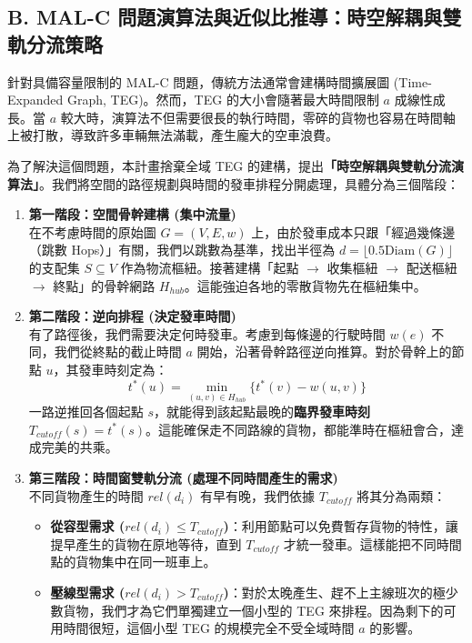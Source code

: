 \documentclass{article}
\begin{document}
\subsection*{B. MAL-C 問題演算法與近似比推導：時空解耦與雙軌分流策略}

針對具備容量限制的 MAL-C 問題，傳統方法通常會建構時間擴展圖 (Time-Expanded Graph, TEG)。然而，TEG 的大小會隨著最大時間限制 $a$ 成線性成長。當 $a$ 較大時，演算法不但需要很長的執行時間，零碎的貨物也容易在時間軸上被打散，導致許多車輛無法滿載，產生龐大的空車浪費。

為了解決這個問題，本計畫捨棄全域 TEG 的建構，提出\textbf{「時空解耦與雙軌分流演算法」}。我們將空間的路徑規劃與時間的發車排程分開處理，具體分為三個階段：

\begin{enumerate}[noitemsep]
    \item \textbf{第一階段：空間骨幹建構 (集中流量)} \\
    在不考慮時間的原始圖 $G=(V, E, w)$ 上，由於發車成本只跟「經過幾條邊（跳數 Hops）」有關，我們以跳數為基準，找出半徑為 $d = \lfloor 0.5 \text{Diam}(G) \rfloor$ 的支配集 $S \subseteq V$ 作為物流樞紐。接著建構「起點 $\to$ 收集樞紐 $\to$ 配送樞紐 $\to$ 終點」的骨幹網路 $H_{hub}$。這能強迫各地的零散貨物先在樞紐集中。
    
    \item \textbf{第二階段：逆向排程 (決定發車時間)} \\
    有了路徑後，我們需要決定何時發車。考慮到每條邊的行駛時間 $w(e)$ 不同，我們從終點的截止時間 $a$ 開始，沿著骨幹路徑逆向推算。對於骨幹上的節點 $u$，其發車時刻定為：
    \begin{equation}
        t^*(u) = \min_{(u,v) \in H_{hub}} \big\{ t^*(v) - w(u,v) \big\}
    \end{equation}
    一路逆推回各個起點 $s$，就能得到該起點最晚的\textbf{臨界發車時刻 $T_{cutoff}(s) = t^*(s)$}。這能確保走不同路線的貨物，都能準時在樞紐會合，達成完美的共乘。
    
    \item \textbf{第三階段：時間窗雙軌分流 (處理不同時間產生的需求)} \\
    不同貨物產生的時間 $rel(d_i)$ 有早有晚，我們依據 $T_{cutoff}$ 將其分為兩類：
    \begin{itemize}
        \item \textbf{從容型需求 ($rel(d_i) \le T_{cutoff}$)}：利用節點可以免費暫存貨物的特性，讓提早產生的貨物在原地等待，直到 $T_{cutoff}$ 才統一發車。這樣能把不同時間點的貨物集中在同一班車上。
        \item \textbf{壓線型需求 ($rel(d_i) > T_{cutoff}$)}：對於太晚產生、趕不上主線班次的極少數貨物，我們才為它們單獨建立一個小型的 TEG 來排程。因為剩下的可用時間很短，這個小型 TEG 的規模完全不受全域時間 $a$ 的影響。
    \end{itemize}
\end{enumerate}
\end{document}
